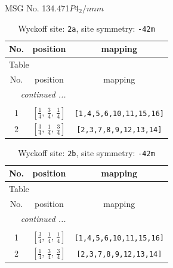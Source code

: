 \documentclass[fleqn,8pt]{jsarticle}
\begin{document}
\setcounter{MaxMatrixCols}{32}

\renewcommand{\tablename}{Table~}
\renewcommand{\figurename}{Figure~}
\begin{center}
\LARGE
MSG No. 134.471\quad$P4_{2}/nnm$
\end{center}
\renewcommand{\arraystretch}{1.2}
\begin{longtable}{ccc}
\caption{Wyckoff site: {\tt 2a}, site symmetry: {\tt -42m}}
 \\
 \hline \hline
No. & position & mapping \\ \hline \endfirsthead

\multicolumn{2}{l}{\tablename\ \thetable{}} \\
 \hline \hline
No. & position & mapping \\ \hline \endhead

 \hline \hline
\multicolumn{2}{r}{\footnotesize\it continued ...} \\ \endfoot

 \hline \hline
\multicolumn{2}{r}{} \\ \endlastfoot

1 & $\left[ \frac{1}{4},\, \frac{3}{4},\, \frac{1}{4} \right]$ & {\tt [1,4,5,6,10,11,15,16]} \\ \hline
2 & $\left[ \frac{3}{4},\, \frac{1}{4},\, \frac{3}{4} \right]$ & {\tt [2,3,7,8,9,12,13,14]} \\
\end{longtable}
\renewcommand{\arraystretch}{1.2}
\begin{longtable}{ccc}
\caption{Wyckoff site: {\tt 2b}, site symmetry: {\tt -42m}}
 \\
 \hline \hline
No. & position & mapping \\ \hline \endfirsthead

\multicolumn{2}{l}{\tablename\ \thetable{}} \\
 \hline \hline
No. & position & mapping \\ \hline \endhead

 \hline \hline
\multicolumn{2}{r}{\footnotesize\it continued ...} \\ \endfoot

 \hline \hline
\multicolumn{2}{r}{} \\ \endlastfoot

1 & $\left[ \frac{3}{4},\, \frac{1}{4},\, \frac{1}{4} \right]$ & {\tt [1,4,5,6,10,11,15,16]} \\ \hline
2 & $\left[ \frac{1}{4},\, \frac{3}{4},\, \frac{3}{4} \right]$ & {\tt [2,3,7,8,9,12,13,14]} \\
\end{longtable}
\end{document}
